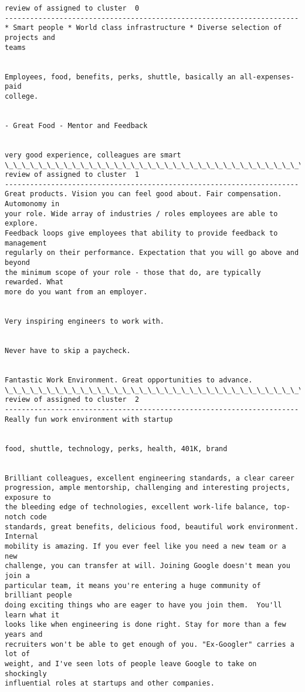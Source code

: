\documentclass[11pt]{article}
\begin{document}
    \begin{Verbatim}[commandchars=\\\{\}]
review of assigned to cluster  0
----------------------------------------------------------------------
* Smart people * World class infrastructure * Diverse selection of projects and
teams


Employees, food, benefits, perks, shuttle, basically an all-expenses-paid
college.


- Great Food - Mentor and Feedback


very good experience, colleagues are smart
\_\_\_\_\_\_\_\_\_\_\_\_\_\_\_\_\_\_\_\_\_\_\_\_\_\_\_\_\_\_\_\_\_\_\_\_\_\_\_\_\_\_\_\_\_\_\_\_\_\_\_\_\_\_\_\_\_\_\_\_\_\_\_\_\_\_\_\_\_\_
review of assigned to cluster  1
----------------------------------------------------------------------
Great products. Vision you can feel good about. Fair compensation. Automonomy in
your role. Wide array of industries / roles employees are able to explore.
Feedback loops give employees that ability to provide feedback to management
regularly on their performance. Expectation that you will go above and beyond
the minimum scope of your role - those that do, are typically rewarded. What
more do you want from an employer.


Very inspiring engineers to work with.


Never have to skip a paycheck.


Fantastic Work Environment. Great opportunities to advance.
\_\_\_\_\_\_\_\_\_\_\_\_\_\_\_\_\_\_\_\_\_\_\_\_\_\_\_\_\_\_\_\_\_\_\_\_\_\_\_\_\_\_\_\_\_\_\_\_\_\_\_\_\_\_\_\_\_\_\_\_\_\_\_\_\_\_\_\_\_\_
review of assigned to cluster  2
----------------------------------------------------------------------
Really fun work environment with startup


food, shuttle, technology, perks, health, 401K, brand


Brilliant colleagues, excellent engineering standards, a clear career
progression, ample mentorship, challenging and interesting projects, exposure to
the bleeding edge of technologies, excellent work-life balance, top-notch code
standards, great benefits, delicious food, beautiful work environment.  Internal
mobility is amazing. If you ever feel like you need a new team or a new
challenge, you can transfer at will. Joining Google doesn't mean you join a
particular team, it means you're entering a huge community of brilliant people
doing exciting things who are eager to have you join them.  You'll learn what it
looks like when engineering is done right. Stay for more than a few years and
recruiters won't be able to get enough of you. "Ex-Googler" carries a lot of
weight, and I've seen lots of people leave Google to take on shockingly
influential roles at startups and other companies.



\end{Verbatim}
\end{document}
